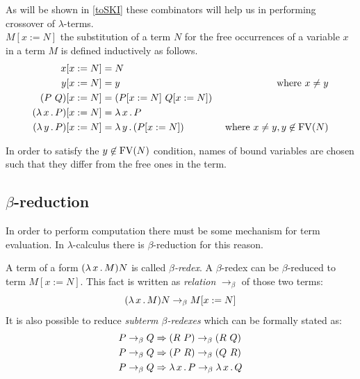 \documentclass[12pt,a4paper]{report}
\newcommand{\lterms}{$\lambda$-terms\xspace}
\begin{document}
As will be shown in \ref{toSKI}
these combinators will help us in performing crossover of \lterms.\\

$M[x:=N]$ the substitution of a term $N$ for the free occurrences of 
a variable $x$ in a term $M$ is defined inductively as follows.
\begin{align*}
x[x:=N]           &= N \\
y[x:=N]           &= y &\text{ where } x \not= y  \\
(P~Q)[x:=N]       &= ( P[x:=N]  ~ Q[x:=N] ) \\
( \lambda \, x \, . \, P )[x:=N] &= \lambda \, x \, . \, P\\
( \lambda \, y \, . \, P )[x:=N] &= \lambda \, y \, . \, ( P[x:=N] ) &\text{ where } x \not= y, y\not\in \mathop{\mathrm{FV}}(N)\\
\end{align*}

In order to satisfy the $y\not\in \mathop{\mathrm{FV}}(N)$ condition, names of bound variables
are chosen such that they differ from the free ones in the term.



\subsection{$\beta$-reduction}

In order to perform computation there must be some
mechanism for term evaluation. In $\lambda$-calculus there
is $\beta$-reduction for this reason.\\

\newcommand{\bRedex}{$\beta$-redex\xspace}
\newcommand{\bRedexes}{$\beta$-redexes\xspace}
\newcommand{\bArrow}{\rightarrow_\beta\xspace}
\newcommand{\eArrow}{\rightarrow_\eta\xspace}
\newcommand{\eeArrow}{\rightarrow_{\eta^{-1}}\xspace}

A term of a form $( \lambda \, x \, . \, M )N$ is called \textit{\bRedex}.
A \bRedex can be $\beta$-reduced to term $M[x:=N]$. 
This fact is written as \textit{relation} $\bArrow$ 
of those two terms:
\begin{equation} \label{eq:bRed}
\lamb{x}{M}N \bArrow M[x:=N]
\end{equation}
It is also possible to reduce \textit{subterm \bRedexes} 
which can be formally stated as:
\begin{align*}
P \bArrow Q &\then (R~P)      \bArrow (R~Q) \\
P \bArrow Q &\then (P~R)      \bArrow (Q~R) \\
P \bArrow Q &\then \lam{x}{P} \bArrow \lam{x}{Q}  
\end{align*}
\end{document}
